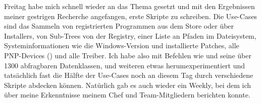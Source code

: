 \sweekdaymarginpar{\weekdayFridayLong}

Freitag habe mich schnell wieder an das Thema gesetzt und mit den Ergebnissen meiner gestrigen Recherche angefangen, erste Skripte zu schreiben.
Die Use-Cases sind das Sammeln von registrierten Programmen aus dem Store oder über Installers, von Sub-Trees von der Registry, einer Liste an Pfaden im Dateisystem, Systeminformationen wie die Windows-Version und installierte Patches, alle PNP-Devices () und alle Treiber.
Ich habe also mit Befehlen wie  und seine über 1300 abfragbaren Datenklassen,  und weiteren etwas herumexperimentiert und tatsächlich fast die Hälfte der Use-Cases noch an diesem Tag durch verschiedene Skripte abdecken können.
Natürlich gab es auch wieder ein Weekly, bei dem ich über meine Erkenntnisse meinem Chef und Team-Mitgliedern berichten konnte.
